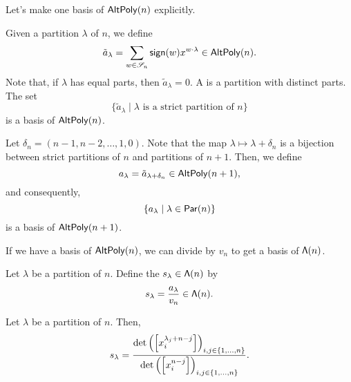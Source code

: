 Let's make one basis of \(\operatorname{\mathsf{AltPoly}}(n)\) explicitly.

Given a partition \(\lambda\) of \(n\),
we define
\begin{equation}
    \tilde{a}_\lambda
    =
    \sum_{w \in \mathscr{S}_{n}}
    \operatorname{\mathsf{sign}}(w)
    x^{w \cdot \lambda} \in \operatorname{\mathsf{AltPoly}}(n).
\end{equation}
Note that, if \(\lambda\) has equal parts, then \(\tilde{a}_\lambda = 0\).
A  is a partition with distinct parts.
The set 
\begin{equation}
    \{ \tilde{a}_\lambda \mid \lambda \text{ is a strict partition of } n \}
\end{equation}
is a basis of \(\operatorname{\mathsf{AltPoly}}(n)\).

Let \(\delta_n = (n-1, n-2, \ldots, 1, 0)\).
Note that the map \(\lambda \mapsto \lambda + \delta_n\) is a bijection between strict partitions of \(n\) and partitions of \(n+1\).
Then, we define
\begin{equation}
    a_\lambda = \tilde{a}_{\lambda + \delta_n} \in \operatorname{\mathsf{AltPoly}}(n+1),
\end{equation}
and consequently, 
\begin{equation}
    \{ a_\lambda \mid \lambda \in \operatorname{\mathsf{Par}}(n) \}
\end{equation}
is a basis of \(\operatorname{\mathsf{AltPoly}}(n+1)\).

If we have a basis of \(\operatorname{\mathsf{AltPoly}}(n)\),
we can divide by \(v_n\) to get a basis of \(\operatorname{\mathsf{\Lambda}}(n)\).

\begin{definition}
    Let \(\lambda\) be a partition of \(n\).
    Define the  \(s_{\lambda} \in \operatorname{\mathsf{\Lambda}}(n)\) by
    \begin{equation}
        s_{\lambda} = \frac{a_\lambda}{v_n} \in \operatorname{\mathsf{\Lambda}}(n).
    \end{equation}
\end{definition}

\begin{proposition} \label{prop:jacobi-bialternant}
    Let \(\lambda\) be a partition of \(n\).
    Then,
    \begin{equation}
        \schur{\lambda} = 
        \frac{
            \det\left(\left[x_i^{\lambda_j + n - j}\right]\right)_{i, j \in \interval{n}}
        }{
            \det\left(\left[x_i^{n - j}\right]\right)_{i, j \in \interval{n}}
        }.
    \end{equation}
\end{proposition}

